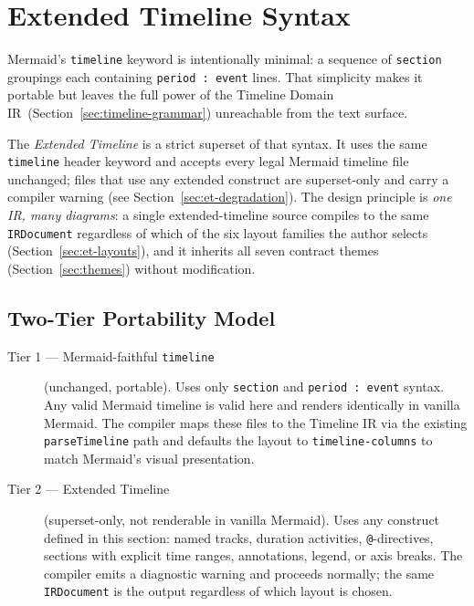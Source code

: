 
\section{Extended Timeline Syntax}
\label{sec:extended-timeline}

Mermaid's \texttt{timeline} keyword is intentionally minimal: a sequence of
\texttt{section} groupings each containing \texttt{period : event} lines.
That simplicity makes it portable but leaves the full power of the Timeline
Domain IR~(Section~\ref{sec:timeline-grammar}) unreachable from the text
surface.

The \emph{Extended Timeline} is a strict superset of that syntax.  It uses
the same \texttt{timeline} header keyword and accepts every legal Mermaid
timeline file unchanged; files that use any extended construct are
superset-only and carry a compiler warning (see
Section~\ref{sec:et-degradation}).  The design principle is \emph{one IR,
many diagrams}: a single extended-timeline source compiles to the same
\texttt{IRDocument} regardless of which of the six layout families the author
selects (Section~\ref{sec:et-layouts}), and it inherits all seven contract
themes (Section~\ref{sec:themes}) without modification.

\subsection{Two-Tier Portability Model}
\label{sec:et-tiers}

\begin{description}
  \item[Tier 1 — Mermaid-faithful \texttt{timeline}] (unchanged, portable).
        Uses only \texttt{section} and \texttt{period : event} syntax.
        Any valid Mermaid timeline is valid here and renders identically in
        vanilla Mermaid.  The compiler maps these files to the Timeline IR
        via the existing \texttt{parseTimeline} path and defaults the layout
        to \texttt{timeline-columns} to match Mermaid's visual presentation.

  \item[Tier 2 — Extended Timeline] (superset-only, not renderable in
        vanilla Mermaid).  Uses any construct defined in this section: named
        tracks, duration activities, \texttt{@}-directives, sections with
        explicit time ranges, annotations, legend, or axis breaks.  The
        compiler emits a diagnostic warning and proceeds normally; the same
        \texttt{IRDocument} is the output regardless of which layout is
        chosen.
\end{description}

